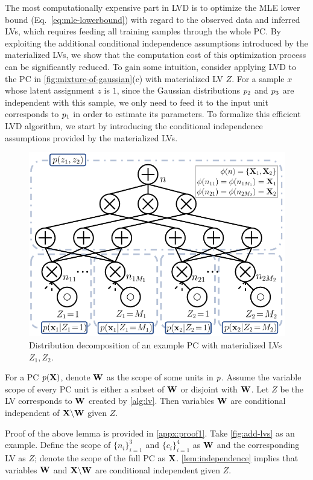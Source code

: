 \documentclass{article} %
\newcommand{\guy}[1]{\textcolor{blue}{\textbf{[Guy: #1]}}}
\begin{document}
The most computationally expensive part in LVD is to optimize the MLE lower bound (Eq.~\ref{eq:mle-lowerbound}) with regard to the observed data and inferred LVs, which requires feeding all training samples through the whole PC. By exploiting the additional conditional independence assumptions introduced by the materialized LVs, we show that the computation cost of this optimization process can be significantly reduced. To gain some intuition, consider applying LVD to the PC in \cref{fig:mixture-of-gaussian}(c) with materialized LV $Z$. For a sample $x$ whose latent assignment $z$ is $1$, since the Gaussian distributions ${p}_2$ and ${p}_3$ are independent with this sample, we only need to feed it to the input unit corresponds to ${p}_1$ in order to estimate its parameters. To formalize this efficient LVD algorithm, we start by introducing the conditional independence assumptions provided by the materialized LVs.
\begin{figure}
    \centering
    \includegraphics[width=0.46\columnwidth]{figures/fig-pc-decomp.pdf}
    \vspace{-2.0em}
    \caption{Distribution decomposition of an example PC with materialized LVs $Z_1, Z_2$.}
    \label{fig:pc-decomp}
    \vspace{-3.0em}
\end{figure}


\begin{lem}
\label{lem:independence}
For a PC ${p}(\mathbf{X})$, denote $\mathbf{W}$ as the scope of some units in ${p}$. Assume the variable scope of every PC unit is either a subset of $\mathbf{W}$ or disjoint with $\mathbf{W}$. Let $Z$ be the LV corresponds to $\mathbf{W}$ created by \cref{alg:lv}. Then variables $\mathbf{W}$ are conditional independent of $\mathbf{X} \backslash \mathbf{W}$ given $Z$. 
\end{lem}

Proof of the above lemma is provided in \cref{appx:proof1}. Take \cref{fig:add-lvs} as an example. Define the scope of $\{n_i\}_{i=1}^{3}$ and $\{c_i\}_{i=1}^{4}$ as $\mathbf{W}$ and the corresponding LV as $Z$; denote the scope of the full PC as $\mathbf{X}$. \cref{lem:independence} implies that variables $\mathbf{W}$ and $\mathbf{X} \backslash \mathbf{W}$ are conditional independent given $Z$. 
\end{document}
